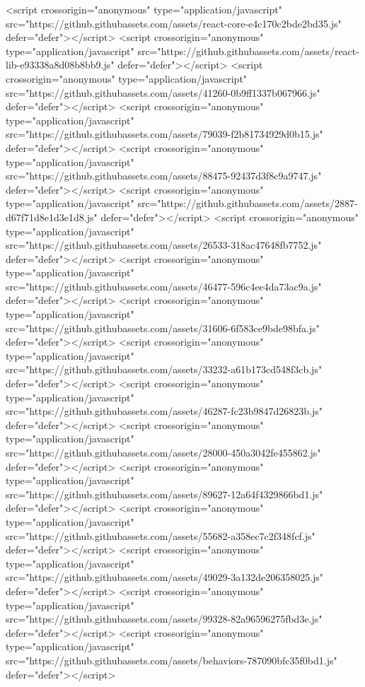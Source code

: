 <script crossorigin="anonymous" type="application/javascript" src="https://github.githubassets.com/assets/react-core-e4c170c2bde2bd35.js" defer="defer"></script>
<script crossorigin="anonymous" type="application/javascript" src="https://github.githubassets.com/assets/react-lib-e93338a8d08b8bb9.js" defer="defer"></script>
<script crossorigin="anonymous" type="application/javascript" src="https://github.githubassets.com/assets/41260-0b9ff1337b067966.js" defer="defer"></script>
<script crossorigin="anonymous" type="application/javascript" src="https://github.githubassets.com/assets/79039-f2b81734929d0b15.js" defer="defer"></script>
<script crossorigin="anonymous" type="application/javascript" src="https://github.githubassets.com/assets/88475-92437d3f8c9a9747.js" defer="defer"></script>
<script crossorigin="anonymous" type="application/javascript" src="https://github.githubassets.com/assets/2887-d67f71d8e1d3e1d8.js" defer="defer"></script>
<script crossorigin="anonymous" type="application/javascript" src="https://github.githubassets.com/assets/26533-318ac47648fb7752.js" defer="defer"></script>
<script crossorigin="anonymous" type="application/javascript" src="https://github.githubassets.com/assets/46477-596c4ee4da73ac9a.js" defer="defer"></script>
<script crossorigin="anonymous" type="application/javascript" src="https://github.githubassets.com/assets/31606-6f583ce9bde98bfa.js" defer="defer"></script>
<script crossorigin="anonymous" type="application/javascript" src="https://github.githubassets.com/assets/33232-a61b173cd548f3cb.js" defer="defer"></script>
<script crossorigin="anonymous" type="application/javascript" src="https://github.githubassets.com/assets/46287-fc23b9847d26823b.js" defer="defer"></script>
<script crossorigin="anonymous" type="application/javascript" src="https://github.githubassets.com/assets/28000-450a3042fe455862.js" defer="defer"></script>
<script crossorigin="anonymous" type="application/javascript" src="https://github.githubassets.com/assets/89627-12a64f4329866bd1.js" defer="defer"></script>
<script crossorigin="anonymous" type="application/javascript" src="https://github.githubassets.com/assets/55682-a358ec7c2f348fcf.js" defer="defer"></script>
<script crossorigin="anonymous" type="application/javascript" src="https://github.githubassets.com/assets/49029-3a132de206358025.js" defer="defer"></script>
<script crossorigin="anonymous" type="application/javascript" src="https://github.githubassets.com/assets/99328-82a96596275fbd3e.js" defer="defer"></script>
<script crossorigin="anonymous" type="application/javascript" src="https://github.githubassets.com/assets/behaviors-787090bfc35f0bd1.js" defer="defer"></script>
